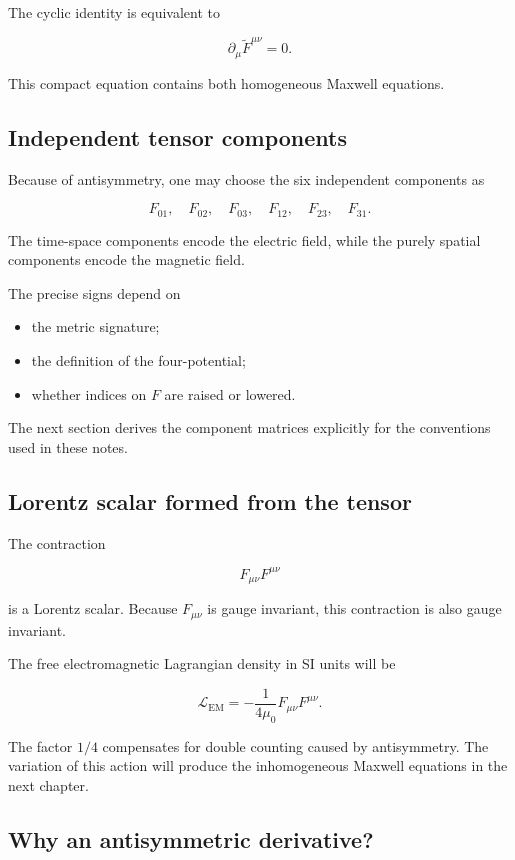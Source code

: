 The cyclic identity is equivalent to

\[
\boxed{
\partial_{\mu}
\widetilde{F}^{\mu\nu}
=0
}.
\]

This compact equation contains both homogeneous Maxwell equations.

\subsection{Independent tensor components}

Because of antisymmetry, one may choose the six independent components as

\[
F_{01},
\quad
F_{02},
\quad
F_{03},
\quad
F_{12},
\quad
F_{23},
\quad
F_{31}.
\]

The time-space components encode the electric field, while the purely spatial components encode the magnetic field.

The precise signs depend on

\begin{itemize}
    \item the metric signature;
    \item the definition of the four-potential;
    \item whether indices on \(F\) are raised or lowered.
\end{itemize}

The next section derives the component matrices explicitly for the conventions used in these notes.

\subsection{Lorentz scalar formed from the tensor}

The contraction

\[
F_{\mu\nu}F^{\mu\nu}
\]

is a Lorentz scalar. Because \(F_{\mu\nu}\) is gauge invariant, this contraction is also gauge invariant.

The free electromagnetic Lagrangian density in SI units will be

\[
\boxed{
\mathcal{L}_{\mathrm{EM}}
=
-
\frac{1}{4\mu_0}
F_{\mu\nu}F^{\mu\nu}
}.
\]

The factor \(1/4\) compensates for double counting caused by antisymmetry. The variation of this action will produce the inhomogeneous Maxwell equations in the next chapter.

\subsection{Why an antisymmetric derivative?}

